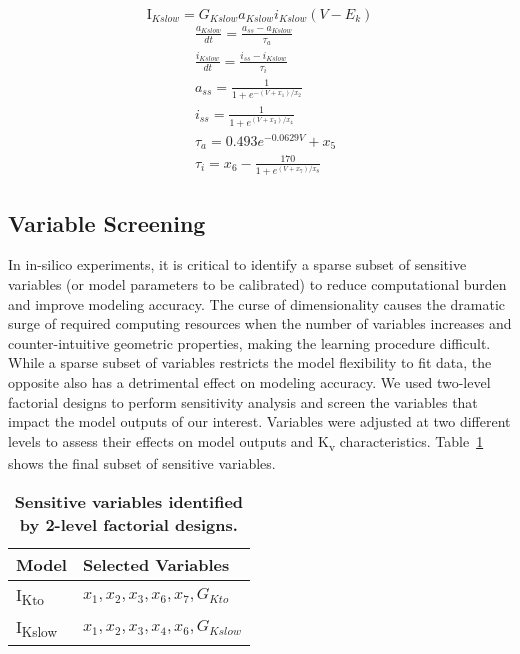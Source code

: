 \documentclass[10pt,letterpaper]{article}
\begin{document}
\begin{equation}
    \mathrm{I}_{Kslow} = G_{Kslow}a_{Kslow}i_{Kslow}(V-E_k)
    \label{eq6}
\end{equation}
\begin{align*}
    &\frac{a_{Kslow}}{dt} = \frac{a_{ss}-a_{Kslow}}{\tau_{a}} \\
    &\frac{i_{Kslow}}{dt} = \frac{i_{ss}-i_{Kslow}}{\tau_{i}} \\
    &a_{ss} = \frac{1}{1+e^{-(V+x_1)/x_2}} \\
    &i_{ss} = \frac{1}{1+e^{(V+x_3)/x_4}} \\
    &\tau_{a} = 0.493 e^{-0.0629V}+x_5 \\
    &\tau_{i} = x_6 - \frac{170}{1+e^{(V+x_7)/x_8}}
\end{align*}

\subsection*{Variable Screening}
In in-silico experiments, it is critical to identify a sparse subset of sensitive variables (or model parameters to be calibrated) to reduce computational burden and improve modeling accuracy. The curse of dimensionality causes the dramatic surge of required computing resources when the number of variables increases and counter-intuitive geometric properties, making the learning procedure difficult. While a sparse subset of variables restricts the model flexibility to fit data, the opposite also has a detrimental effect on modeling accuracy. We used two-level factorial designs to perform sensitivity analysis and screen the variables that impact the model outputs of our interest. Variables were adjusted at two different levels to assess their effects on model outputs and K\textsubscript{v} characteristics. Table~\ref{table1} shows the final subset of sensitive variables.

\begin{table}
    \centering
    \caption{\bf{Sensitive variables identified by 2-level factorial designs.}}
    \begin{tabular}{ll}
        \hline
        Model & Selected Variables  \\ 
        \hline
        I\textsubscript{Kto} & $x_1, x_2, x_3, x_6, x_7, G_{Kto}$ \\
        I\textsubscript{Kslow} & $x_1, x_2, x_3, x_4, x_6, G_{Kslow}$ \\
        \hline
    \end{tabular}
    \label{table1}
\end{table}
\end{document}
